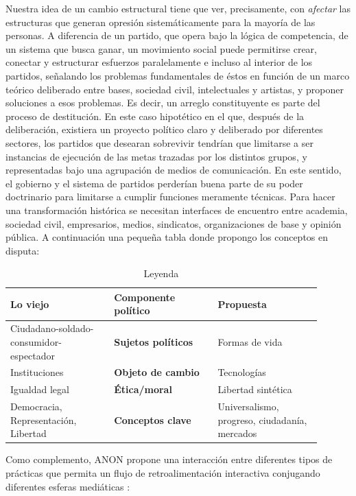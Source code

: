 Nuestra idea de un cambio estructural tiene que ver, precisamente, con \emph{afectar} las estructuras que generan opresión sistemáticamente para la mayoría de las personas. A diferencia de un partido, que opera bajo la lógica de competencia, de un sistema que busca ganar, un movimiento social puede permitirse crear, conectar y estructurar esfuerzos paralelamente e incluso al interior de los partidos, señalando los problemas fundamentales de éstos en función de un marco teórico deliberado entre bases, sociedad civil, intelectuales y artistas, y proponer soluciones a esos problemas. Es decir, un arreglo constituyente es parte del proceso de destitución. En este caso hipotético en el que, después de la deliberación, existiera un proyecto político claro y deliberado por diferentes sectores, los partidos que desearan sobrevivir tendrían que limitarse a ser instancias de ejecución de las metas trazadas por los distintos grupos, y representadas bajo una agrupación de medios de comunicación. En este sentido, el gobierno y el sistema de partidos perderían buena parte de su poder doctrinario para limitarse a cumplir funciones meramente técnicas. Para hacer una transformación histórica se necesitan interfaces de encuentro entre academia, sociedad civil, empresarios, medios, sindicatos, organizaciones de base y opinión pública. A continuación una pequeña tabla donde propongo los conceptos en disputa:

\begin{table}[htb]
  \caption{Leyenda}
  \label{tab:tablename}
  \centering
  \begin{tabular}{p{0.3\linewidth}p{0.3\linewidth}p{0.3\linewidth}}
    \toprule
    \textbf{Lo viejo} & \textbf{Componente político} & \textbf{Propuesta} \\
    \midrule
    Ciudadano-soldado-consumidor-espectador & \textbf{Sujetos políticos} & Formas de vida \\
    Instituciones & \textbf{Objeto de cambio} & Tecnologías \\
    Igualdad legal & \textbf{Ética/moral} & Libertad sintética \\
    Democracia, Representación, Libertad & \textbf{Conceptos clave} & Universalismo, progreso, ciudadanía, mercados \\
    \bottomrule
  \end{tabular}
\end{table}

Como complemento, ANON propone una interacción entre diferentes tipos de prácticas que permita un flujo de retroalimentación interactiva conjugando diferentes esferas mediáticas \autocite{AltWokeCompanion2017}:

